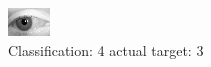 \begin{figure}[h!]
\begin{center}
\includegraphics[width=0.60\columnwidth]{figures/ID2856_class_4_target_3.png}
\end{center}
\caption{ Classification: 4 actual target: 3}
\label{fig:ID2856_class_4_target_3}
\end{figure}
